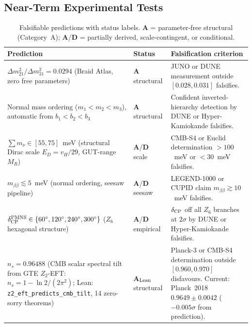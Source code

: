 \documentclass[11pt]{article}
\theoremstyle{remark}
\newcommand{\CatAL}{\textbf{A}$_{\rm Lean}$}
\begin{document}
\subsection{Near-Term Experimental Tests}
\begin{table}[H]
\centering
\footnotesize\RaggedRight\sloppy
\setlength{\tabcolsep}{2.8pt}
\renewcommand{\arraystretch}{1.18}
\caption{Falsifiable predictions with status labels.  \textbf{A} = parameter-free structural (Category~A);  \textbf{A}/\textbf{D} = partially derived, scale-contingent, or conditional.}
\label{tab:predictions}
\begin{tabularx}{\columnwidth}{@{}>{\RaggedRight\arraybackslash}X >{\RaggedRight\arraybackslash}p{} >{\RaggedRight\arraybackslash}X@{}}
\toprule
\textbf{Prediction} & \textbf{Status} & \textbf{Falsification criterion} \\
\midrule
$\Delta m^2_{21}/\Delta m^2_{31} = 0.0294$ (Braid Atlas, zero free parameters) & \textbf{A} structural & JUNO or DUNE measurement outside $[0.028, 0.031]$ falsifies. \\
Normal mass ordering ($m_1 < m_2 < m_3$), automatic from $b_1 < b_2 < b_3$ & \textbf{A} structural & Confident inverted-hierarchy detection by DUNE or Hyper-Kamiokande falsifies. \\
$\sum m_\nu \in [55, 75]$~meV (structural Dirac scale $E_D = v_H/29$, GUT-range $M_R$) & \textbf{A}/\textbf{D} scale & CMB-S4 or Euclid determination $> 100$~meV or $< 30$~meV falsifies. \\
$m_{\beta\beta} \lesssim 5$~meV (normal ordering, seesaw pipeline) & \textbf{A}/\textbf{D} seesaw & LEGEND-1000 or CUPID claim $m_{\beta\beta} \gtrsim 10$~meV falsifies. \\
$\delta_{\rm CP}^{\rm PMNS} \in \{60^\circ, 120^\circ, 240^\circ, 300^\circ\}$ ($Z_6$ hexagonal structure) & \textbf{A}/\textbf{D} empirical & $\delta_{\rm CP}$ off all $Z_6$ branches at $2\sigma$ by DUNE or Hyper-Kamiokande falsifies. \\
$n_s = 0.96488$ (CMB scalar spectral tilt from GTE $Z_2$-EFT: $n_s = 1 - \ln2/(2\pi^2)$; Lean: \texttt{z2\_eft\_predicts\_cmb\_tilt}, 14 zero-sorry theorems) & \CatAL{} structural & Planck-3 or CMB-S4 determination outside $[0.960, 0.970]$ disfavours.  Current: Planck~2018 $0.9649 \pm 0.0042$ ($-0.005\sigma$ from prediction). \\

\end{tabularx}
\end{table}
\end{document}
